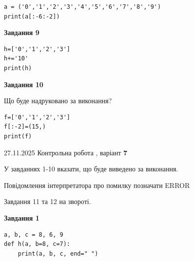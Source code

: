 \documentclass[12pt, ukrainian]{article}
\begin{document}
{{{{{{{\begin{minipage}[t]{10.5cm}
\begin{verbatim}
a = ('0','1','2','3','4','5','6','7','8','9')
print(a[:-6:-2])
\end{verbatim}



\begin{center}
\textbf{Завдання 9}
\end{center}

\begin{verbatim}
h=['0','1','2','3']
h+='10'
print(h)
\end{verbatim}



\begin{center}
\textbf{Завдання 10}
\end{center}
Що буде надруковано за виконання?\par
\begin{verbatim}
f=['0','1','2','3']
f[:-2]=(15,)
print(f)
\end{verbatim}

\end{minipage}

}
\newpage

{{ 27.11.2025 Контрольна робота , варіант  \No \textbf { 7 }\par}}
{

{%



У завданнях 1-10 вказати, що буде виведено за виконання.

Повідомлення інтерпретатора про помилку позначати ERROR

Завдання 11 та 12 на звороті.

\begin{minipage}[t]{7.5cm}

\begin{center}
\textbf{Завдання 1}
\end{center}

\begin{verbatim}
a, b, c = 8, 6, 9
def h(a, b=8, c=7):
    print(a, b, c, end=" ")


\end{verbatim}
\end{minipage}}}}}}}}}
\end{document}

